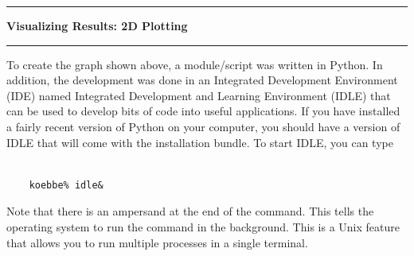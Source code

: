 \documentclass[10pt,fleqn]{article}
\begin{document}
\eject
\vskip0.1in\hrule\vskip0.1in\noindent
{\bf Visualizing Results: 2D Plotting} 
\vskip0.1in\hrule\vskip0.1in\noindent
To create the graph shown above, a module/script was written in Python. In
addition, the development was done in an Integrated Development Environment
(IDE) named Integrated Development and Learning Environment (IDLE) that can be
used to develop bits of code into useful applications. If you have installed a
fairly recent version of Python on your computer, you should have a version of
IDLE that will come with the installation bundle. To start IDLE, you can type
\begin{verbatim}

    koebbe% idle&

\end{verbatim}
Note that there is an ampersand at the end of the command. This tells the
operating system to run the command in the background. This is a Unix feature
that allows you to run multiple processes in a single terminal.
\end{document}

